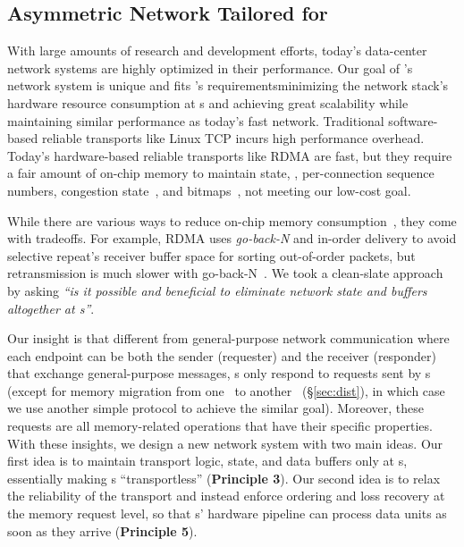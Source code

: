 \subsection{Asymmetric Network Tailored for \md}
\label{sec:network}
With large amounts of research and development efforts, today's data-center network systems are highly optimized in their performance.
Our goal of \sys's network system is unique and fits \md's requirements\textemdash minimizing the network stack's hardware resource consumption at \MN{}s and achieving great scalability while maintaining similar performance as today's fast network.
Traditional software-based reliable transports like Linux TCP incurs high performance overhead.
Today's hardware-based reliable transports like RDMA are fast, but they require a fair amount of on-chip memory to maintain state, \eg, per-connection sequence numbers, congestion state~\cite{TONIC}, and bitmaps~\cite{IRN,MELO-APNet}, not meeting our low-cost goal.

While there are various ways to reduce on-chip memory consumption~\cite{1RMA},
they come with tradeoffs.
For example, RDMA uses {\em go-back-N} and in-order delivery to avoid selective repeat's receiver buffer space for sorting out-of-order packets, but retransmission is much slower with go-back-N~\cite{MELO-APNet,IRN}.
We took a clean-slate approach by asking \emph{``is it possible and beneficial to eliminate network state and buffers altogether at \MN{}s''}.
\fi

Our insight is that different from general-purpose network communication where each endpoint can be both the sender (requester) and the receiver (responder) that exchange general-purpose messages,
\MN{}s only respond to requests sent by \CN{}s (except for memory migration from one \MN\ to another \MN\ (\S\ref{sec:dist}), in which case we use another simple protocol to achieve the similar goal).
Moreover, these requests are all memory-related operations that have their specific properties.
With these insights, we design a new network system with two main ideas.
Our first idea is to maintain transport logic, state, and data buffers only at \CN{}s,
essentially making \MN{}s ``transportless'' (\textbf{Principle 3}). 
Our second idea is to relax the reliability of the transport and instead enforce ordering and loss recovery at the memory request level, so that \MN{}s' hardware pipeline can process data units as soon as they arrive (\textbf{Principle 5}).

